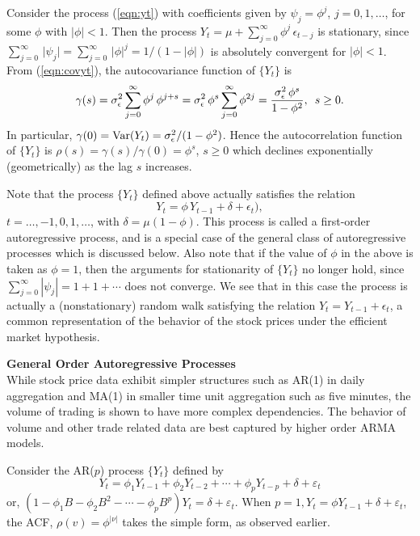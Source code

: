 \begin{ex}\label{ex:autoregor1}
Consider the process (\ref{eqn:yt}) with coefficients given by $\psi_j = \phi^j$, $j=0,1,\ldots$,  for some $\phi$ with $\lvert\phi\rvert<1$. Then the process $Y_t = \mu + \sum_{j=0}^{\infty} \phi^j \, \epsilon_{t-j}$ is stationary, since $\sum_{j=0}^{\infty} \, \lvert\psi_j\rvert= \sum_{j=0}^{\infty} \, \lvert\phi\rvert^j = 1/(1-\lvert\phi\rvert)$ is absolutely convergent for $\lvert\phi\rvert < 1$. From (\ref{eqn:covyt}), the autocovariance function of $\{Y_t\}$ is
	\[
	\gamma(s)= \sigma^2_{\epsilon} \sum_{j=0}^{\infty} \phi^j \, \phi^{j+s}= \sigma^2_{\epsilon} \, \phi^s \sum_{j=0}^{\infty} \phi^{2j}= \frac{\sigma^2_{\epsilon} \, \phi^s}{1 - \phi^2}, \enskip s \geq 0.
	\]
In particular, $\gamma(0) = \operatorname{Var}(Y_t) = \sigma^2_{\epsilon}/(1-\phi^2)$. Hence the autocorrelation function of $\{Y_t\}$ is $\rho(s)= \gamma(s)/\gamma(0)= \phi^s$, $ s \geq 0$ which declines exponentially (geometrically) as the lag $s$ increases.

Note that the process $\{Y_t\}$ defined above actually satisfies the relation 
	\[
	Y_t= \phi \, Y_{t-1} + \delta+\epsilon_t),
	\]
$t=\ldots,-1,0,1,\ldots$, with $\delta = \mu(1-\phi)$. This process is called a first-order autoregressive process, and is a special case of the general class of autoregressive processes which is discussed below. Also note that if the value of $\phi$ in the above is taken as  $\phi = 1$, then the arguments for stationarity of $\{Y_t\}$ no longer hold, since $\sum_{j=0}^{\infty} |\psi_j| = 1+1+\cdots$ does not converge. We see that in this case the process is actually a (nonstationary) random walk satisfying the relation  $Y_t = Y_{t-1}+\epsilon_t$, a common representation of the behavior of the stock prices under the efficient market hypothesis. 
\end{ex}


\noindent\textbf{General Order Autoregressive Processes} \\

While stock price data exhibit simpler structures such as AR(1) in daily aggregation and MA(1) in smaller time unit aggregation such as five minutes, the volume of trading is shown to have more complex dependencies. The behavior of volume and other trade related data are best captured by higher order ARMA models. 

Consider the AR($p$) process $\{Y_t\}$ defined by
	\begin{equation}\label{eqn:ytsum}
	Y_t = \phi_1Y_{t-1} + \phi_2Y_{t-2} +\cdots + \phi_pY_{t-p} + \delta + \varepsilon_t
	\end{equation}
or, $(1-\phi_1B - \phi_2B^2 - \cdots - \phi_pB^p)Y_t = \delta + \varepsilon_t$. When $p=1, Y_t = \phi Y_{t-1} + \delta + \varepsilon_t$, the ACF, $\rho(v)=\phi^{\lvert \nu \rvert}$ takes the simple form, as observed earlier.


